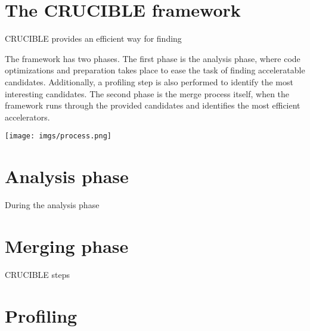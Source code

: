 \section{The CRUCIBLE framework}

CRUCIBLE provides an efficient way for finding  

The framework has two phases. The first phase is the analysis phase, where code optimizations
and preparation takes place to ease the task of finding acceleratable candidates. Additionally, 
a profiling step is also performed to identify the most interesting candidates. The second phase
is the merge process itself, when the framework runs through the provided candidates and identifies
the most efficient accelerators.

\texttt{[image: imgs/process.png]}

\section{Analysis phase}

During the analysis phase 



\section{Merging phase}




{\color{red} CRUCIBLE steps}

\section{Profiling}
